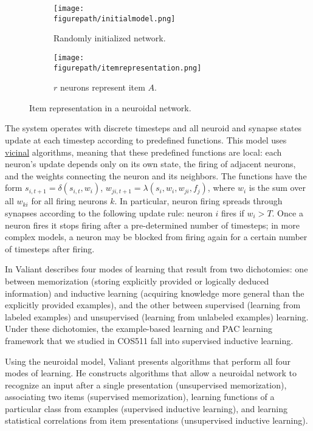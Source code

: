 \documentclass[letterpaper, 12pt]{article}
\newcommand{\figurepath}{../../Figures}
\begin{document}
\begin{figure}[!htb]
\centering
\begin{subfigure}[b]{0.45\textwidth}
      \texttt{[image: \\figurepath/initialmodel.png]}
      \caption*{Randomly initialized network.}
\end{subfigure}
\begin{subfigure}[b]{0.45\textwidth}
      \texttt{[image: \\figurepath/itemrepresentation.png]}
      \caption*{$r$ neurons represent item $A$.}
\end{subfigure}
\caption{Item representation in a neuroidal network.}
\end{figure}

The system operates with discrete timesteps and all neuroid and synapse states update at each timestep according to predefined functions. This model uses \underline{vicinal} algorithms, meaning that these predefined functions are local: each neuron's update depends only on its own state, the firing of adjacent neurons, and the weights connecting the neuron and its neighbors. The functions have the form $s_{i,t+1}=\delta(s_{i,t},w_i)$, $w_{ji,t+1}=\lambda(s_i,w_i,w_{ji},f_j)$, where $w_i$ is the sum over all $w_{ki}$ for all firing neurons $k$. In particular, neuron firing spreads through synapses according to the following update rule: neuron $i$ fires if $w_i>T$. Once a neuron fires it stops firing after a pre-determined number of timesteps; in more complex models, a neuron may be blocked from firing again for a certain number of timesteps after firing.

In \cite{valiant_circuits_1994} Valiant describes four modes of learning that result from two dichotomies: one between memorization (storing explicitly provided or logically deduced information) and inductive learning (acquiring knowledge more general than the explicitly provided examples), and the other between supervised (learning from labeled examples) and unsupervised (learning from unlabeled examples) learning. Under these dichotomies, the example-based learning and PAC learning framework that we studied in COS511 fall into supervised inductive learning.

Using the neuroidal model, Valiant presents algorithms that perform all four modes of learning. He constructs algorithms that allow a neuroidal network to recognize an input after a single presentation (unsupervised memorization), associating two items (supervised memorization), learning functions of a particular class from examples (supervised inductive learning), and learning statistical correlations from item presentations (unsupervised inductive learning).
\end{document}
